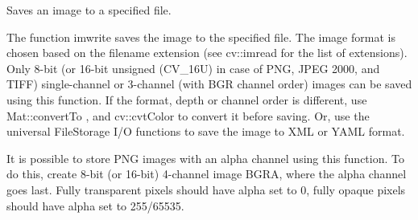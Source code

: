 Saves an image to a specified file. 

The function imwrite saves the image to the specified file. The image format is chosen based on the filename extension (see cv\+::imread for the list of extensions). Only 8-\/bit (or 16-\/bit unsigned (C\+V\+\_\+16U) in case of P\+NG, J\+P\+EG 2000, and T\+I\+FF) single-\/channel or 3-\/channel (with \textquotesingle{}B\+GR\textquotesingle{} channel order) images can be saved using this function. If the format, depth or channel order is different, use Mat\+::convert\+To , and cv\+::cvt\+Color to convert it before saving. Or, use the universal File\+Storage I/O functions to save the image to X\+ML or Y\+A\+ML format. 

It is possible to store P\+NG images with an alpha channel using this function. To do this, create 8-\/bit (or 16-\/bit) 4-\/channel image B\+G\+RA, where the alpha channel goes last. Fully transparent pixels should have alpha set to 0, fully opaque pixels should have alpha set to 255/65535. 

